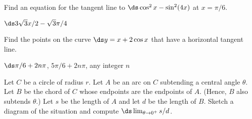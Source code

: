 \begin{exercises}
\begin{exercise} Find an equation for the tangent line to $\ds \cos ^2 x -
\sin ^2 (4x)$ at $x=\pi/6$.
\begin{answer} $\ds 3\sqrt3x/2-\sqrt3\pi/4$
\end{answer}\end{exercise}

\begin{exercise} Find the points on the curve $\ds y= x+ 2\cos x$ that have a
horizontal tangent line.
\begin{answer} $\ds \pi/6+2n\pi$, $5\pi/6+2n\pi$, any integer $n$
\end{answer}\end{exercise}

\begin{exercise} Let $C$ be a circle of radius $r$. Let $A$ be an arc on $C$
subtending a central angle $\theta$. Let $B$ be the chord of
$C$ whose endpoints are the endpoints of $A$. (Hence, $B$ also
subtends $\theta$.) Let $s$ be the length of $A$
and let $d$ be the length of $B$. Sketch a diagram of the situation
and compute $\ds \lim_{\theta \to 0^+ } s/d$.
\end{exercise}

\end{exercises}

